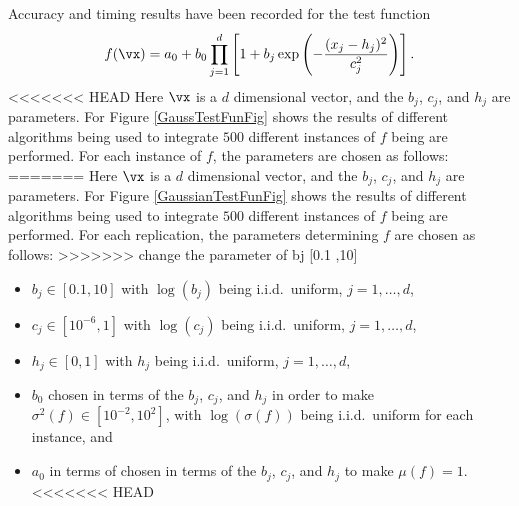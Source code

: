\documentclass[graybox]{svmult}
\begin{document}
Accuracy and timing results have been recorded for the test function
\begin{equation} \label{GaussianTestFun}
f(\vx)=a_0 + b_0\prod_{j=1}^d\left[ 1 +b_j \exp \left(-\frac{(x_j-h_j)^2}{c_j^2}\right) \right].
\end{equation}
<<<<<<< HEAD
Here $\vx$ is a $d$ dimensional vector, and the $b_j$, $c_j$, and $h_j$ are parameters.  For Figure \ref{GaussTestFunFig} shows the results of different algorithms being used to integrate $500$ different instances of $f$ being are performed.  For each instance of $f$, the parameters are chosen as follows:
=======
Here $\vx$ is a $d$ dimensional vector, and the $b_j$, $c_j$, and $h_j$ are parameters.  For Figure \ref{GaussianTestFunFig} shows the results of different algorithms being used to integrate $500$ different instances of $f$ being are performed.  For each replication, the parameters determining $f$ are chosen as follows:
>>>>>>> change the parameter of bj [0.1 ,10]
\begin{itemize} 
\item $b_j \in [0.1,10]$ with $\log(b_j)$ being i.i.d.\ uniform, $j=1, \ldots, d$,
\item $c_j \in [10^{-6},1]$ with $\log(c_j)$ being i.i.d.\ uniform, $j=1, \ldots, d$,
\item $h_j \in [0,1]$ with $h_j$ being i.i.d.\ uniform, $j=1, \ldots, d$,
\item $b_0$ chosen in terms of the $b_j$, $c_j$, and $h_j$ in order to make $\sigma^2(f) \in [10^{-2}, 10^2]$, with $\log(\sigma(f))$ being i.i.d.\ uniform for each instance, and
\item $a_0$ in terms of chosen in terms of the $b_j$, $c_j$, and $h_j$ to make $\mu(f)=1$.
<<<<<<< HEAD
\end{itemize}
\end{document}
